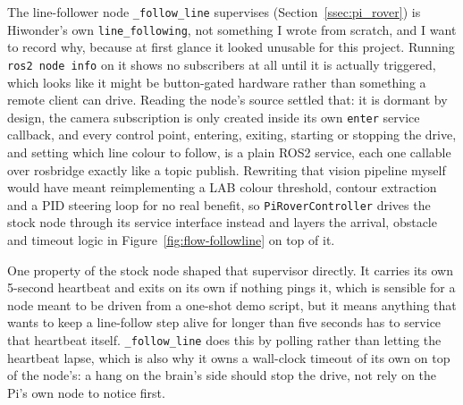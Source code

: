 The line-follower node \texttt{\_follow\_line} supervises
(Section~\ref{ssec:pi_rover}) is Hiwonder's own
\texttt{line\_following}, not something I wrote from scratch, and I want
to record why, because at first glance it looked unusable for this
project. Running \texttt{ros2 node info} on it shows no subscribers at
all until it is actually triggered, which looks like it might be
button-gated hardware rather than something a remote client can drive.
Reading the node's source settled that: it is dormant by design, the
camera subscription is only created inside its own \texttt{enter}
service callback, and every control point, entering, exiting, starting
or stopping the drive, and setting which line colour to follow, is a
plain ROS2 service, each one callable over rosbridge exactly like a
topic publish. Rewriting that vision pipeline myself would have meant
reimplementing a LAB colour threshold, contour extraction and a PID
steering loop for no real benefit, so \texttt{PiRoverController} drives
the stock node through its service interface instead and layers the
arrival, obstacle and timeout logic in Figure~\ref{fig:flow-followline}
on top of it.

One property of the stock node shaped that supervisor directly. It
carries its own 5-second heartbeat and exits on its own if nothing pings
it, which is sensible for a node meant to be driven from a one-shot demo
script, but it means anything that wants to keep a line-follow step
alive for longer than five seconds has to service that heartbeat itself.
\texttt{\_follow\_line} does this by polling rather than letting the
heartbeat lapse, which is also why it owns a wall-clock timeout of its
own on top of the node's: a hang on the brain's side should stop the
drive, not rely on the Pi's own node to notice first.
